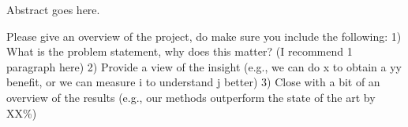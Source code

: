 Abstract goes here.

Please give an overview of the project, do make sure you include the following:
1) What is the problem statement, why does this matter? (I recommend 1 paragraph here)
2) Provide a view of the insight (e.g., we can do x to obtain a yy benefit, or we can measure i to understand j better) 
3) Close with a bit of an overview of the results (e.g., our methods outperform the state of the art by XX\%)
